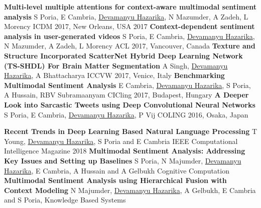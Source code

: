 \begin{cvpublications}
  \cvpublication
    {\textbf{Multi-level multiple attentions for context-aware multimodal sentiment analysis}} %
    {S Poria, E Cambria, \underline{Devamanyu Hazarika}, N Mazumder, A Zadeh, L Morency} %
    {ICDM 2017, New Orleans, USA} %
    {2017} %
  \cvpublication
    {\textbf{Context-dependent sentiment analysis in user-generated videos}} %
    {S Poria, E Cambria, \underline{Devamanyu Hazarika}, N Mazumder, A Zadeh, L Morency} %
    {ACL 2017, Vancouver, Canada} %
    {} %
  \cvpublication
    {\textbf{Texture and Structure Incorporated ScatterNet Hybrid Deep Learning Network (TS-SHDL) For Brain Matter Segmentation}} %
    {A Singh, \underline{Devamanyu Hazarika}, A Bhattacharya} %
    {ICCVW 2017, Venice, Italy} %
    {} %
  \cvpublication
    {\textbf{Benchmarking Multimodal Sentiment Analysis}} %
    {E Cambria, \underline{Devamanyu Hazarika}, S Poria, A Hussain, RBV Subramaanyam} %
    {CICling 2017, Budapest, Hungary} %
    {} %
  \cvpublication
    {\textbf{A Deeper Look into Sarcastic Tweets using Deep Convolutional Neural Networks}} %
    {S Poria, E Cambria, \underline{Devamanyu Hazarika}, P Vij} %
    {COLING 2016, Osaka, Japan} %
    {} %
    
\end{cvpublications}




\begin{cvpublications}
  \cvpublication
    {\textbf{Recent Trends in Deep Learning Based Natural Language Processing}}  %
    {T Young, \underline{Devamanyu Hazarika}, S Poria and E Cambria} %
    {IEEE Computational Intelligence Magazine} %
    {2018} %
  \cvpublication
    {\textbf{Multimodal Sentiment Analysis: Addressing Key Issues and Setting up Baselines}}  %
    {S Poria, N Majumder, \underline{Devamanyu Hazarika}, E Cambria, A Hussain and A Gelbukh} %
    {Cognitive Computation} %
    {} %
  \cvpublication
    {\textbf{Multimodal Sentiment Analysis using Hierarchical Fusion with Context Modeling}}  %
    {N Majumder, \underline{Devamanyu Hazarika}, A Gelbukh, E Cambria and S Poria,} %
    {Knowledge Based Systems} %
    {} %
\end{cvpublications}

